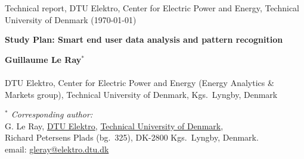 \documentclass[fleqn,a4paper,twoside,11pt]{article}
\begin{document}
%


\thispagestyle{empty}
{\scriptsize{Technical report, DTU Elektro, Center for Electric Power and Energy, Technical University of Denmark} (\today)}


\vspace{2.6mm}

\vspace{3cm}
\begin{spacing}{1.6}
{\LARGE{\textbf{Study Plan: Smart end user data analysis and pattern recognition}}}

\end{spacing}

\vspace{1cm}

\begin{spacing}{1.1}
\small{{\bf Guillaume Le Ray}$^{*}$}\\
\\
\noindent
\footnotesize{DTU Elektro, Center for Electric Power and Energy (Energy Analytics \& Markets group), Technical University of Denmark, Kgs.\ Lyngby, Denmark}\\
\end{spacing}



\vspace{9cm}
\begin{spacing}{0.9}
 { \it \footnotesize{$^{*}$  Corresponding author:}}\\
 {\footnotesize{G. Le Ray,  \href{http://www.elektro.dtu.dk}{DTU
 Elektro}, \href{http://www.dtu.dk}{Technical University of
 Denmark}, }}\\
 {\footnotesize{Richard Petersens Plads (bg.\ 325),
 DK-2800 Kgs.\ Lyngby, Denmark.}}\\
 {\footnotesize{email:
 \href{mailto:gleray@elektro.dtu.dk}{gleray@elektro.dtu.dk}}} 
\end{spacing}


\newpage

\tableofcontents

\newpage
\listoffigures

\listoftables
\end{document}
